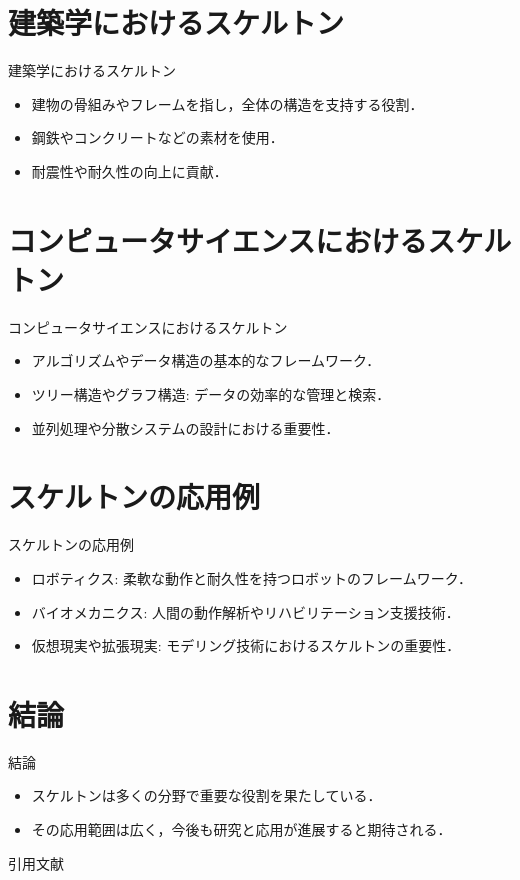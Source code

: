 \documentclass[
  dvipdfmx,
  aspectratio=169,
]{beamer}
\begin{document}
\section{建築学におけるスケルトン}

\begin{frame}{建築学におけるスケルトン}
	\begin{itemize}
		\item 建物の骨組みやフレームを指し，全体の構造を支持する役割．
		\item 鋼鉄やコンクリートなどの素材を使用．
		\item 耐震性や耐久性の向上に貢献．
	\end{itemize}
\end{frame}

\section{コンピュータサイエンスにおけるスケルトン}

\begin{frame}{コンピュータサイエンスにおけるスケルトン}
	\begin{itemize}
		\item アルゴリズムやデータ構造の基本的なフレームワーク．
		\item ツリー構造やグラフ構造: データの効率的な管理と検索．
		\item 並列処理や分散システムの設計における重要性．
	\end{itemize}
\end{frame}

\section{スケルトンの応用例}

\begin{frame}{スケルトンの応用例}
	\begin{itemize}
		\item ロボティクス: 柔軟な動作と耐久性を持つロボットのフレームワーク．
		\item バイオメカニクス: 人間の動作解析やリハビリテーション支援技術．
		\item 仮想現実や拡張現実: モデリング技術におけるスケルトンの重要性．
	\end{itemize}
\end{frame}

\section{結論}

\begin{frame}{結論}
	\begin{itemize}
		\item スケルトンは多くの分野で重要な役割を果たしている．
		\item その応用範囲は広く，今後も研究と応用が進展すると期待される．
	\end{itemize}
\end{frame}

\begin{frame}{引用文献}
	\printbibliography[title=引用文献]{}
\end{frame}
\end{document}
